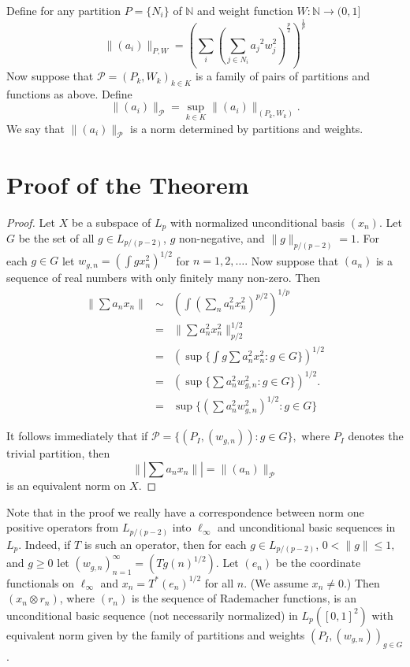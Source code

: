 \documentclass[12pt]{amsart}
\theoremstyle{definition}
\theoremstyle{remark}
\numberwithin{equation}{section}
\begin{document}
Define for any partition
$P=\{ N_i\}$ of $\mathbb{N}$ and weight function $ W : {\mathbb{N}}
 \rightarrow { ( 0, 1 ]}$
  $$ \|(a_i)\|_{P,W} = \left(\sum_{i} \left (
 \sum_{j\in {N_i}} {a_j}^2 w_{j}^{2}\right)^{\frac{p}{2}}\right)
^{\frac{1}{p}} $$
Now suppose that ${\mathcal{P}}=(P_k, W_k)_{k\in K}$ is a family of
pairs of
partitions and functions as above.
Define
$$
 \|(a_i)\|_{\mathcal{P}} =  \sup_{k\in K}
 \|(a_i)\|_{(P_k, W_k)}.
$$
We say that
$\|(a_i)\|_{\mathcal{P}}$ is a norm determined by partitions and weights.


\section{Proof of the Theorem}

\begin{proof} Let $X$ be a subspace of $L_p$ with normalized
unconditional basis $(x_n)$. Let $G$ be the set of all $g \in L_{p/(p-2)}$,
$g$ non-negative, and $\|g\|_{p/(p-2)}=1.$ For each $g \in G$
 let $w_{g,n}=(\int g x_n^2)^{1/2}$ for $n =1, 2, \dots.$
Now suppose that $(a_n)$ is a sequence of real numbers with only finitely many non-zero.
Then
\begin{eqnarray*}
\| \sum a_n x_n\| &\sim &
\left ( \int \left (\sum_n a_n^2 x_n^2 \right )^{p/2}\right )^{1/p} \\
&= &\|\sum a_n^2 x_n^2 \|_{p/2}^{1/2} \\
&= &\left (\sup\{\int g\sum a_n^2 x_n^2:g \in G\} \right )^{1/2}\\
&= &\left (\sup \{\sum a_n^2 w_{g,n}^2: g\in G\} \right )^{1/2}.\\
&= &\sup \{ \left (\sum a_n^2 w_{g,n}^2  \right )^{1/2} : g\in G\}
\end{eqnarray*}

It follows immediately that if $\mathcal P=\{(P_I,(w_{g,n})):g \in G\},$ where
$P_I$ denotes the trivial partition,
then 
$$ \||\sum a_n x_n\|| = \|(a_n)\|_{\mathcal P}$$
is an equivalent norm on $X$.
\end{proof}

Note that in the proof we really have a correspondence between norm one
positive operators from $L_{p/(p-2)}$ into $\ell_\infty$
and unconditional basic sequences in $L_p$. Indeed, if $T$ is such an
operator, then for each $g \in L_{p/(p-2)}$, $0<\|g\|\le 1,$
and $g \ge 0$ let $(w_{g,n})_{n=1}^\infty=(Tg(n)^{1/2})$. Let $(e_n)$ be
the coordinate functionals on $\ell_\infty$ and $x_n = T^*(e_n)^{1/2}$
for all $n$. (We assume $x_n \ne 0.$)
Then $(x_n \otimes r_n)$, where $(r_n)$ is the sequence of
Rademacher
functions, is an unconditional basic sequence (not necessarily normalized)
in $L_p([0,1]^2)$ with equivalent norm given by the family of partitions and
weights $(P_I, (w_{g,n}))_{g\in G}$.
\end{document}
